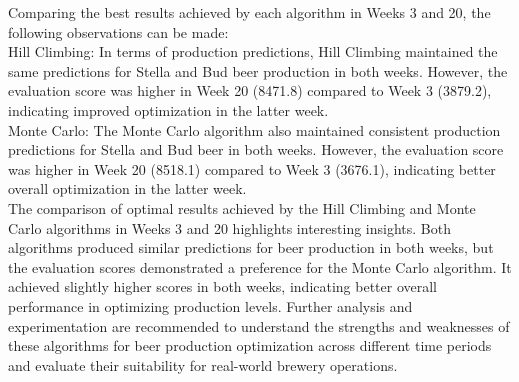 Comparing the best results achieved by each algorithm in Weeks 3 and 20, the following observations can be made:\\

\textbullet Hill Climbing: In terms of production predictions, Hill Climbing maintained the same predictions for Stella and Bud beer production in both weeks. However, the evaluation score was higher in Week 20 (8471.8) compared to Week 3 (3879.2), indicating improved optimization in the latter week.\\

\textbullet Monte Carlo: The Monte Carlo algorithm also maintained consistent production predictions for Stella and Bud beer in both weeks. However, the evaluation score was higher in Week 20 (8518.1) compared to Week 3 (3676.1), indicating better overall optimization in the latter week.\\
    
The comparison of optimal results achieved by the Hill Climbing and Monte Carlo algorithms in Weeks 3 and 20 highlights interesting insights. Both algorithms produced similar predictions for beer production in both weeks, but the evaluation scores demonstrated a preference for the Monte Carlo algorithm. It achieved slightly higher scores in both weeks, indicating better overall performance in optimizing production levels. Further analysis and experimentation are recommended to understand the strengths and weaknesses of these algorithms for beer production optimization across different time periods and evaluate their suitability for real-world brewery operations.